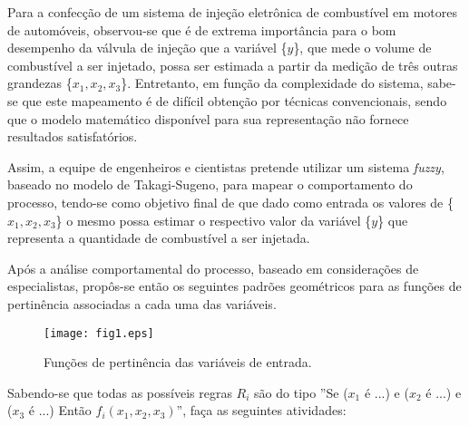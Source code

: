 \documentclass{report}
\begin{document}
\newpage

Para a confecção de um sistema de injeção eletrônica de combustível em motores de
automóveis, observou-se que é de extrema importância para o bom desempenho da válvula de
injeção que a variável \{$y$\}, que mede o volume de combustível a ser injetado, possa ser estimada
a partir da medição de três outras grandezas \{$x_1, x_2, x_3$\}. Entretanto, em função da complexidade
do sistema, sabe-se que este mapeamento é de difícil obtenção por técnicas convencionais, sendo
que o modelo matemático disponível para sua representação não fornece resultados satisfatórios.

Assim, a equipe de engenheiros e cientistas pretende utilizar um sistema \emph{fuzzy}, baseado
no modelo de Takagi-Sugeno, para mapear o comportamento do processo, tendo-se como
objetivo final de que dado como entrada os valores de \{$x_1, x_2, x_3$\} o mesmo possa estimar o
respectivo valor da variável \{$y$\} que representa a quantidade de combustível a ser injetada.

Após a análise comportamental do processo, baseado em considerações de especialistas,
propôs-se então os seguintes padrões geométricos para as funções de pertinência associadas a
cada uma das variáveis.

\begin{figure}[hptb]
\centering
\texttt{[image: fig1.eps]}
\caption{Funções de pertinência das variáveis de entrada.}
\label{fig:fig1}
\end{figure}

Sabendo-se que todas as possíveis regras $R_i$ são do tipo ''Se ($x_1$ é ...) e ($x_2$ é ...) e ($x_3$ é ...)
Então $f_i(x_1, x_2, x_3)$'', faça as seguintes atividades:
\end{document}
